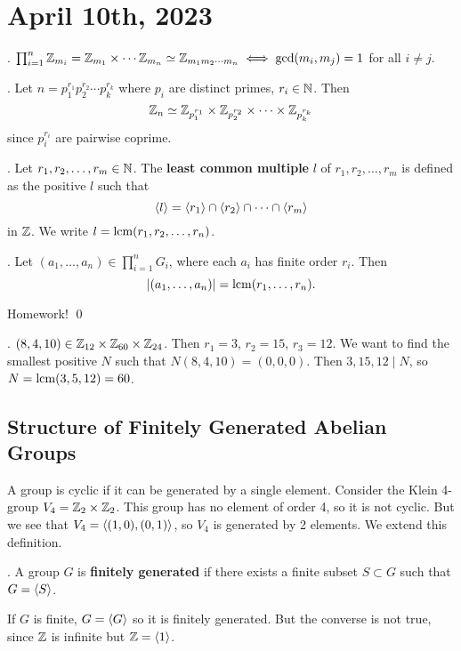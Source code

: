 \section*{April 10th, 2023}

\cor. \(\prod_{i=1}^n \mathbb{Z}_{m_i} = \mathbb{Z}_{m_1} \times \cdots \mathbb{Z}_{m_n} \simeq \mathbb{Z}_{m_1 m_2 \cdots m_n} \iff \gcd(m_i, m_j) = 1\) for all \(i \neq j\).

\ex. Let \(n = p_1^{r_1}p_2^{r_2} \cdots p_k^{r_k}\) where \(p_i\) are distinct primes, \(r_i \in \mathbb{N}\). Then
\[
    \mathbb{Z}_n \simeq \mathbb{Z}_{p_1^{r_1}} \times \mathbb{Z}_{p_2^{r_2}} \times \cdots \times \mathbb{Z}_{p_k^{r_k}}
\]
since \(p_i^{r_i}\) are pairwise coprime.

.  Let \(r_1, r_2, \dots, r_m \in \mathbb{N}\). The \textbf{least common multiple} \(l\) of \(r_1, r_2, \dots, r_m\) is defined as the positive \(l\) such that
\[
    \left\langle l \right\rangle = \left\langle r_1 \right\rangle \cap \left\langle r_2 \right\rangle \cap \cdots \cap \left\langle r_m \right\rangle
\]
in \(\mathbb{Z}\). We write \(l = {\rm lcm}(r_1, r_2, \dots, r_n)\).

\thm. Let \((a_1, \dots, a_n) \in \prod_{i=1}^n G_i\), where each \(a_i\) has finite order \(r_i\). Then
\[
    \left| (a_1, \dots, a_n) \right| = {\rm lcm}(r_1, \dots, r_n).
\]

\pf Homework! \qed

\ex. \((8, 4, 10) \in \mathbb{Z}_{12} \times \mathbb{Z}_{60} \times \mathbb{Z}_{24}\). Then \(r_1 = 3\), \(r_2 = 15\), \(r_3 = 12\). We want to find the smallest positive \(N\) such that \(N (8, 4, 10) = (0, 0, 0)\). Then \(3, 15, 12 \mid N\), so \(N = {\rm lcm}(3, 5, 12) = 60\).

\pagebreak

\subsection*{Structure of Finitely Generated Abelian Groups}

A group is cyclic if it can be generated by a single element. Consider the Klein 4-group \(V_4 = \mathbb{Z}_2 \times \mathbb{Z}_2\). This group has no element of order 4, so it is not cyclic. But we see that \(V_4 = \left\langle (1, 0), (0, 1) \right\rangle\), so \(V_4\) is generated by 2 elements. We extend this definition.

.  A group \(G\) is \textbf{finitely generated} if there exists a finite subset \(S \subset G\) such that \(G = \left\langle S \right\rangle\).

\rmk If \(G\) is finite, \(G = \left\langle G \right\rangle\) so it is finitely generated. But the converse is not true, since \(\mathbb{Z}\) is infinite but \(\mathbb{Z} = \left\langle 1 \right\rangle\).

